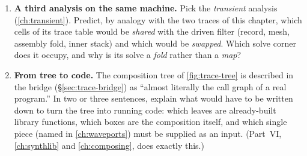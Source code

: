 \begin{enumerate}[nosep]
  electrostatic trace.
  \item \textbf{A third analysis on the same machine.} Pick the \emph{transient}
  analysis (\cref{ch:transient}). Predict, by analogy with the two traces of this
  chapter, which cells of its trace table would be \emph{shared} with the driven
  filter (record, mesh, assembly fold, inner stack) and which would be
  \emph{swapped}. Which solve corner does it occupy, and why is its solve a
  \emph{fold} rather than a \emph{map}?
  \item \textbf{From tree to code.} The composition tree of \cref{fig:trace-tree} is
  described in the bridge (\S\ref{sec:trace-bridge}) as ``almost literally the call
  graph of a real program.'' In two or three sentences, explain what would have to
  be written down to turn the tree into running code: which leaves are already-built
  library functions, which boxes are the composition itself, and which single piece
  (named in \cref{ch:waveports}) must be supplied as an input. (Part~VI,
  \cref{ch:synthlib} and \cref{ch:composing}, does exactly this.)
\end{enumerate}
